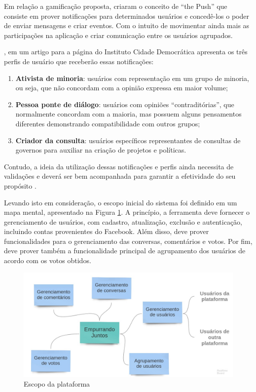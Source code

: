 Em relação a gamificação proposta,  criaram o conceito de ``the Push'' que consiste
em prover notificações para determinados usuários e concedê-los o poder de enviar mensagens e criar eventos. Com 
o intuito de movimentar ainda mais as participações na aplicação e criar comunicação entre os usuários agrupados.

, em um artigo para a página do Instituto Cidade Democrática apresenta os três perfis de usuário
que receberão essas notificações:

\begin{enumerate}
  \item \textbf{Ativista de minoria}: usuários com representação em um grupo de minoria, ou seja, que não concordam com a opinião 
    expressa em maior volume;
  \item \textbf{Pessoa ponte de diálogo}: usuários com opiniões ``contraditórias'', que normalmente concordam com a maioria, mas
    possuem alguns pensamentos diferentes demonstrando compatibilidade com outros grupos;
  \item \textbf{Criador da consulta}: usuários específicos representantes de consultas de governos para auxiliar na criação de projetos
  e políticas.
\end{enumerate}


Contudo, a ideia da utilização dessas notificações e perfis ainda necessita de validações e deverá ser bem
acompanhada para garantir a efetividade do seu propósito \cite{empurrandojuntos, parra}. 

Levando isto em consideração, o escopo inicial do sistema foi definido em um mapa mental, apresentado na Figura \ref{fig:mapa_mental_ej}. 
A princípio, a ferramenta deve fornecer o gerenciamento de usuários, com cadastro, atualização, exclusão e autenticação, 
incluindo contas provenientes do Facebook. Além disso, deve prover funcionalidades para o gerenciamento das conversas, comentários
e votos. Por fim, deve prover também a funcionalidade principal de agrupamento dos usuários de acordo com os votos obtidos.

\begin{figure}[h!]
\centering
\includegraphics[scale=0.35]{figuras/mapa_mental_ej.jpg}
\caption{Escopo da plataforma}
\label{fig:mapa_mental_ej}
\end{figure}



